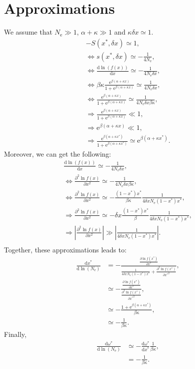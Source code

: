 \documentclass{article}
\newcommand{\der}{\mathrm{d}}
\newcommand{\e}{\mathrm{e}}
\newcommand{\Ne}{N_{\mathrm{e}}}
\newcommand{\dnds}{\omega}
\newcommand{\x}{x}
\newcommand{\eq}{^{*}}
\newcommand{\dx}{\delta \x}
\begin{document}
\section*{Approximations}
We assume that $\Ne \gg 1$, $\alpha + \kappa \gg 1$ and $\kappa \dx \simeq 1$.
\begin{gather}
-S(\x\eq, \dx) \simeq 1, \\
\iff s(\x\eq, \dx) \simeq -\frac{1}{4 \Ne}, \\
\iff \frac{\der \ln (f(\x))}{\der \x} \simeq - \frac{1}{4 \Ne \dx}, \\
\iff \beta \kappa \frac{\e^{\beta(\alpha + \kappa \x)}}{1 + \e^{\beta(\alpha + \kappa \x)}} \simeq \frac{1}{4 \Ne \dx}, \\
\iff \frac{\e^{\beta(\alpha + \kappa \x)}}{1 + \e^{\beta(\alpha + \kappa \x)}} \simeq \frac{1}{4 \Ne \dx \beta \kappa}, \\
\Longrightarrow \frac{\e^{\beta(\alpha + \kappa \x)}}{1 + \e^{\beta(\alpha + \kappa \x)}} \ll 1, \\
\Longrightarrow \e^{\beta(\alpha + \kappa \x)} \ll 1, \\
\Longrightarrow \frac{\e^{\beta(\alpha + \kappa \x\eq)}}{1 + \e^{\beta(\alpha + \kappa \x\eq)}} \simeq \e^{\beta(\alpha + \kappa \x\eq)}.
\end{gather}
Moreover, we can get the following:
\begin{gather}
\frac{\der \ln (f(\x))}{\der \x} \simeq - \frac{1}{4 \Ne \dx}, \\
\iff \frac{ \partial^2 \ln f(\x) }{\partial {\x}^2} \simeq - \frac{1}{4 \Ne \dx \beta \kappa }, \\
\iff \frac{ \partial^2 \ln f(\x) }{\partial {\x}^2} \simeq - \frac{(1 - \x\eq)\x\eq }{\beta \kappa} \frac{1}{4 \dx \Ne  (1 - \x\eq) \x\eq}, \\
\Longrightarrow \frac{ \partial^2 \ln f(\x) }{\partial {\x}^2} \simeq - \dx \frac{(1 - \x\eq)\x\eq }{\beta } \frac{1}{4 \dx \Ne  (1 - \x\eq) \x\eq}, \\
\Longrightarrow \left| \frac{ \partial^2 \ln f(\x) }{\partial {\x}^2} \right| \gg \left| \frac{1}{4 \dx \Ne  (1 - \x\eq) \x\eq} \right|. \\
\end{gather}
Together, these approximations leads to:
\begin{align}
\frac{ \der \x\eq}{\der \ln (\Ne)} & = - \frac{\frac{ \partial \ln f(\x\eq) }{\partial {\x\eq}}}{\frac{1}{4 \dx \Ne  (1 - \x\eq) \x\eq} + \frac{ \partial^2 \ln f(\x\eq) }{\partial {\x\eq}^2}}, \\
& \simeq - \frac{\frac{ \partial \ln f(\x\eq) }{\partial {\x\eq}}}{\frac{ \partial^2 \ln f(\x\eq) }{\partial {\x\eq}^2}}, \\
& \simeq - \frac{1 + \e^{\beta(\alpha + \kappa \x\eq)}}{\beta \kappa}, \\
& \simeq - \frac{1}{\beta \kappa}.
\end{align}
Finally,
\begin{align}
\frac{ \der \dnds\eq}{\der \ln (\Ne)}  & \simeq - \frac{ \der \dnds\eq}{\der \x\eq} \frac{1}{\beta \kappa}, \\
  & = - \frac{1}{\beta \kappa}.
\end{align}
\end{document}
